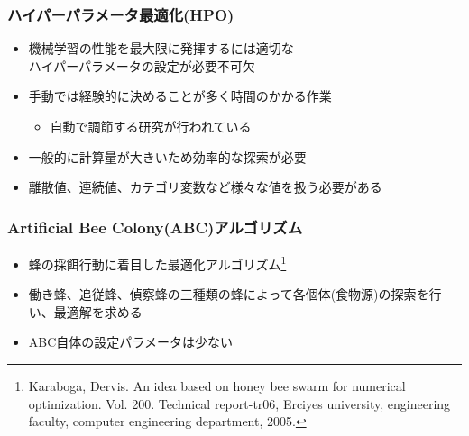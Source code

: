 \documentclass[11pt,dvipdfmx,cjk]{beamer}
\begin{document}
\frame{\titlepage}
\begin{frame}
  \frametitle{ハイパーパラメータ最適化(HPO)}
  \begin{itemize}
    \item 機械学習の性能を最大限に発揮するには適切な\\ハイパーパラメータの設定が必要不可欠
    \item 手動では経験的に決めることが多く時間のかかる作業
     \begin{itemize}
       \item 自動で調節する研究が行われている
     \end{itemize}
    \item 一般的に計算量が大きいため効率的な探索が必要
    \item 離散値、連続値、カテゴリ変数など様々な値を扱う必要がある
  \end{itemize}
\end{frame}
\begin{frame}
  \frametitle{Artificial Bee Colony(ABC)アルゴリズム}
  \begin{itemize}
    \item 蜂の採餌行動に着目した最適化アルゴリズム\footnote{Karaboga, Dervis. An idea based on honey bee swarm for numerical optimization. Vol. 200. Technical report-tr06, Erciyes university, engineering faculty, computer engineering department, 2005.}
    \item 働き蜂、追従蜂、偵察蜂の三種類の蜂によって各個体(食物源)の探索を行い、最適解を求める
    \item ABC自体の設定パラメータは少ない
  \end{itemize}
\end{frame}
\end{document}

